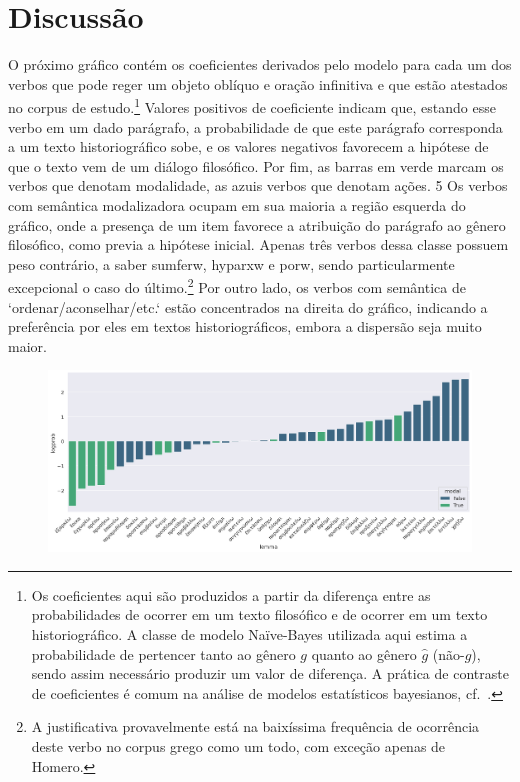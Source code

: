 \documentclass[a4paper,article,12pt,oneside]{memoir}
\begin{document}
\chapter{Discussão}

O próximo gráfico contém os coeficientes derivados pelo modelo para cada um dos verbos que pode reger um objeto oblíquo e oração infinitiva e que estão atestados no corpus de estudo.\footnote{Os coeficientes aqui são produzidos a partir da diferença entre as probabilidades de ocorrer em um texto filosófico e de ocorrer em um texto historiográfico. A classe de modelo Naïve-Bayes utilizada aqui estima a probabilidade de pertencer tanto ao gênero $g$ quanto ao gênero $\hat{g}$ (não-$g$), sendo assim necessário produzir um valor de diferença. A prática de contraste de coeficientes é comum na análise de modelos estatísticos bayesianos, cf.~\textcite{McElreath2020}.}
Valores positivos de coeficiente indicam que, estando esse verbo em um dado parágrafo, a probabilidade de que este parágrafo corresponda a um texto historiográfico sobe, e os valores negativos favorecem a hipótese de que o texto vem de um diálogo filosófico.
Por fim, as barras em verde marcam os verbos que denotam modalidade, as azuis verbos que denotam ações.
5
Os verbos com semântica modalizadora ocupam em sua maioria a região esquerda do gráfico, onde a presença de um item favorece a atribuição do parágrafo ao gênero filosófico, como previa a hipótese inicial. Apenas três verbos dessa classe possuem peso contrário, a saber sumferw, hyparxw e porw, sendo particularmente excepcional o caso do último.\footnote{A justificativa provavelmente está na baixíssima frequência de ocorrência deste verbo no corpus grego como um todo, com exceção apenas de Homero.}
Por outro lado, os verbos com semântica de `ordenar\slash{}aconselhar\slash{}etc.` estão concentrados na direita do gráfico, indicando a preferência por eles em textos historiográficos, embora a dispersão seja muito maior.

\begin{figure}[!ht]
	\begin{center}
		\includegraphics[width=1.0\linewidth]{./figs/diff2.png}
	\end{center}
\end{figure}
\end{document}
